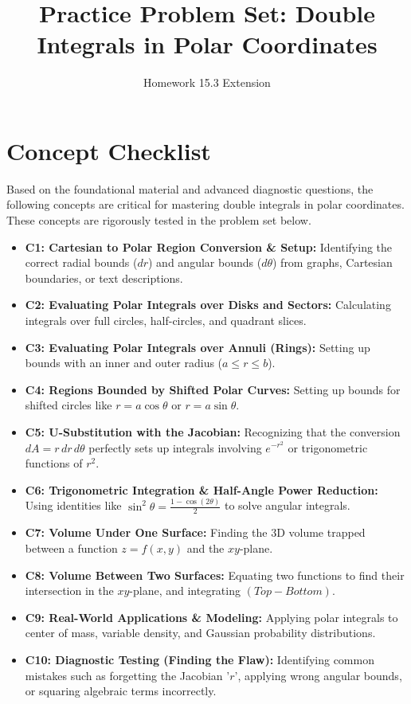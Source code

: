 \documentclass[11pt]{article}
\title{Practice Problem Set: Double Integrals in Polar Coordinates}
\author{Homework 15.3 Extension}
\date{}
\begin{document}
\maketitle

\section*{Concept Checklist}
Based on the foundational material and advanced diagnostic questions, the following concepts are critical for mastering double integrals in polar coordinates. These concepts are rigorously tested in the problem set below.

\begin{itemize}
    \item \textbf{C1: Cartesian to Polar Region Conversion \& Setup:} Identifying the correct radial bounds ($dr$) and angular bounds ($d\theta$) from graphs, Cartesian boundaries, or text descriptions.
    \item \textbf{C2: Evaluating Polar Integrals over Disks and Sectors:} Calculating integrals over full circles, half-circles, and quadrant slices.
    \item \textbf{C3: Evaluating Polar Integrals over Annuli (Rings):} Setting up bounds with an inner and outer radius ($a \le r \le b$).
    \item \textbf{C4: Regions Bounded by Shifted Polar Curves:} Setting up bounds for shifted circles like $r = a \cos\theta$ or $r = a \sin\theta$.
    \item \textbf{C5: U-Substitution with the Jacobian:} Recognizing that the conversion $dA = r \, dr \, d\theta$ perfectly sets up integrals involving $e^{-r^2}$ or trigonometric functions of $r^2$.
    \item \textbf{C6: Trigonometric Integration \& Half-Angle Power Reduction:} Using identities like $\sin^2\theta = \frac{1-\cos(2\theta)}{2}$ to solve angular integrals.
    \item \textbf{C7: Volume Under One Surface:} Finding the 3D volume trapped between a function $z = f(x,y)$ and the $xy$-plane.
    \item \textbf{C8: Volume Between Two Surfaces:} Equating two functions to find their intersection in the $xy$-plane, and integrating $(Top - Bottom)$.
    \item \textbf{C9: Real-World Applications \& Modeling:} Applying polar integrals to center of mass, variable density, and Gaussian probability distributions.
    \item \textbf{C10: Diagnostic Testing (Finding the Flaw):} Identifying common mistakes such as forgetting the Jacobian '$r$', applying wrong angular bounds, or squaring algebraic terms incorrectly.
\end{itemize}
\end{document}
